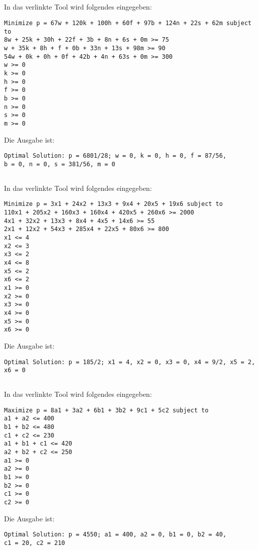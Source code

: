 \documentclass[10pt,a4paper,oneside,ngerman,numbers=noenddot]{scrartcl}
\begin{document}
	\subsection{} %
		In das verlinkte Tool wird folgendes eingegeben:
\begin{verbatim}
Minimize p = 67w + 120k + 100h + 60f + 97b + 124n + 22s + 62m subject to
8w + 25k + 30h + 22f + 3b + 8n + 6s + 0m >= 75
w + 35k + 8h + f + 0b + 33n + 13s + 98m >= 90
54w + 0k + 0h + 0f + 42b + 4n + 63s + 0m >= 300
w >= 0
k >= 0
h >= 0
f >= 0
b >= 0
n >= 0
s >= 0
m >= 0
\end{verbatim}
		Die Ausgabe ist:
\begin{verbatim}
Optimal Solution: p = 6801/28; w = 0, k = 0, h = 0, f = 87/56, 
b = 0, n = 0, s = 381/56, m = 0
\end{verbatim}
	\subsection{} %
		In das verlinkte Tool wird folgendes eingegeben:
\begin{verbatim}
Minimize p = 3x1 + 24x2 + 13x3 + 9x4 + 20x5 + 19x6 subject to
110x1 + 205x2 + 160x3 + 160x4 + 420x5 + 260x6 >= 2000
4x1 + 32x2 + 13x3 + 8x4 + 4x5 + 14x6 >= 55
2x1 + 12x2 + 54x3 + 285x4 + 22x5 + 80x6 >= 800
x1 <= 4
x2 <= 3
x3 <= 2
x4 <= 8
x5 <= 2
x6 <= 2
x1 >= 0
x2 >= 0
x3 >= 0
x4 >= 0
x5 >= 0
x6 >= 0
\end{verbatim}
		Die Ausgabe ist: 
\begin{verbatim}
Optimal Solution: p = 185/2; x1 = 4, x2 = 0, x3 = 0, x4 = 9/2, x5 = 2, x6 = 0
\end{verbatim}
	\subsection{} %
		In das verlinkte Tool wird folgendes eingegeben:
\begin{verbatim}
Maximize p = 8a1 + 3a2 + 6b1 + 3b2 + 9c1 + 5c2 subject to
a1 + a2 <= 400
b1 + b2 <= 480
c1 + c2 <= 230
a1 + b1 + c1 <= 420
a2 + b2 + c2 <= 250
a1 >= 0
a2 >= 0
b1 >= 0
b2 >= 0
c1 >= 0
c2 >= 0
\end{verbatim}
	Die Ausgabe ist:
\begin{verbatim}
Optimal Solution: p = 4550; a1 = 400, a2 = 0, b1 = 0, b2 = 40, 
c1 = 20, c2 = 210
\end{verbatim}
\end{document}
